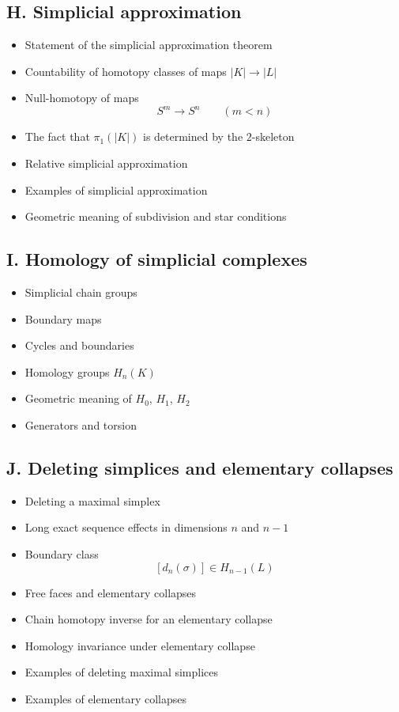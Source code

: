 \documentclass[12pt,a4paper]{article}
\theoremstyle{notespace}
\begin{document}
	\subsection*{H. Simplicial approximation}
	\begin{itemize}
		\item Statement of the simplicial approximation theorem
		\item Countability of homotopy classes of maps \(|K|\to |L|\)
		\item Null-homotopy of maps
		\[
		S^m\to S^n \qquad (m<n)
		\]
		\item The fact that \(\pi_1(|K|)\) is determined by the \(2\)-skeleton
		\item Relative simplicial approximation
		\item Examples of simplicial approximation
		\item Geometric meaning of subdivision and star conditions
	\end{itemize}
	
	\subsection*{I. Homology of simplicial complexes}
	\begin{itemize}
		\item Simplicial chain groups
		\item Boundary maps
		\item Cycles and boundaries
		\item Homology groups \(H_n(K)\)
		\item Geometric meaning of \(H_0\), \(H_1\), \(H_2\)
		\item Generators and torsion
	\end{itemize}
	
	\subsection*{J. Deleting simplices and elementary collapses}
	\begin{itemize}
		\item Deleting a maximal simplex
		\item Long exact sequence effects in dimensions \(n\) and \(n-1\)
		\item Boundary class
		\[
		[d_n(\sigma)]\in H_{n-1}(L)
		\]
		\item Free faces and elementary collapses
		\item Chain homotopy inverse for an elementary collapse
		\item Homology invariance under elementary collapse
		\item Examples of deleting maximal simplices
		\item Examples of elementary collapses
	\end{itemize}
	
\end{document}
